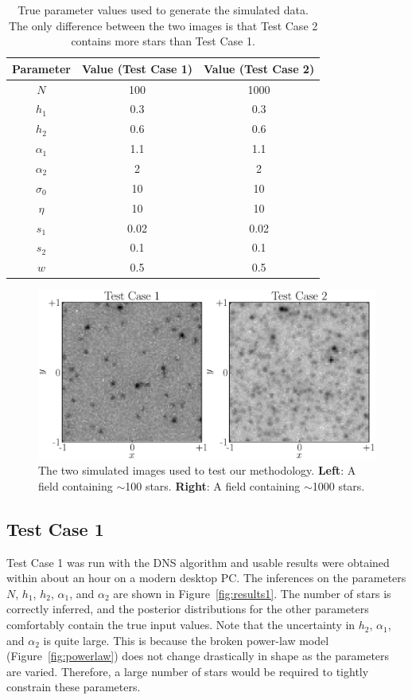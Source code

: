 \documentclass[12pt, preprint]{aastex}
\begin{document}
\begin{table}[ht!]\footnotesize
\begin{center}
\begin{tabular}{|c|c|c|}
\hline
Parameter & Value (Test Case 1) & Value (Test Case 2)\\
\hline
$N$ & 100 & 1000\\
$h_1$ & 0.3 & 0.3\\
$h_2$ & 0.6 & 0.6\\
$\alpha_1$ & 1.1 & 1.1\\
$\alpha_2$ & 2 & 2\\
\hline
$\sigma_0$ & 10 & 10\\
$\eta$ & 10 & 10 \\
$s_1$ & 0.02 & 0.02\\
$s_2$ & 0.1 & 0.1\\
$w$ & 0.5 & 0.5\\
\hline
\end{tabular}
\end{center}
\caption{True parameter values used to generate the simulated data. The only
difference between the two images is that Test Case 2 contains more stars than
Test Case 1.
\label{tab:truth}}
\end{table}

\begin{figure}[ht!]
\begin{center}
\includegraphics[width=\textwidth]{Figures/test_cases.eps}
\caption{The two simulated images used to test our methodology.
{\bf Left}: A field containing $\sim$100 stars.
{\bf Right}: A field containing $\sim$1000 stars.\label{fig:simulated_data}}
\end{center}
\end{figure}

\subsection{Test Case 1}
Test Case 1 was run with the DNS algorithm and usable results were obtained
within about an hour on a modern desktop PC. The inferences on the parameters
$N$, $h_1$, $h_2$, $\alpha_1$, and $\alpha_2$ are shown in
Figure~\ref{fig:results1}. The number of stars is correctly inferred, and the
posterior distributions for the other parameters comfortably contain the true
input values. Note that the uncertainty in $h_2$, $\alpha_1$, and $\alpha_2$ is
quite large. This is because the broken power-law model
(Figure~\ref{fig:powerlaw}) does not change drastically in shape as the
parameters are varied. Therefore, a large number of stars would be required to
tightly constrain these parameters.
\end{document}

